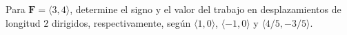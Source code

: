 Para $\mathbf{F}=\langle3,4\rangle$, determine el signo y el valor del trabajo en desplazamientos de longitud $2$ dirigidos, respectivamente, según $\langle1,0\rangle$, $\langle-1,0\rangle$ y $\langle4/5,-3/5\rangle$.
